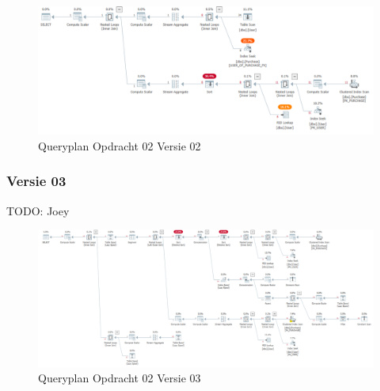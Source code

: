 
\begin{figure}[H]
    \centering
    \includegraphics[width=1\textwidth]{image/marc/opdracht-02a.PNG}
    \caption{Queryplan Opdracht 02 Versie 02}
\end{figure}

\subsubsection{Versie 03}
TODO: Joey

\begin{figure}[H]
    \centering
    \includegraphics[width=1\textwidth]{image/joey/opdracht-02a.PNG}
    \caption{Queryplan Opdracht 02 Versie 03}
\end{figure}

